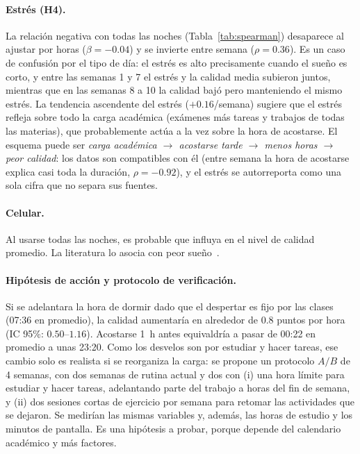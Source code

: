 \documentclass[conference]{IEEEtran}
\begin{document}
\paragraph{Estrés (H4).} La relación negativa con todas las noches (Tabla~\ref{tab:spearman}) desaparece al ajustar por horas ($\beta=-0.04$) y se invierte entre semana ($\rho=0.36$). Es un caso de confusión por el tipo de día: el estrés es alto precisamente cuando el sueño es corto, y entre las semanas 1 y 7 el estrés y la calidad media subieron juntos, mientras que en las semanas 8 a 10 la calidad bajó pero manteniendo el mismo estrés. La tendencia ascendente del estrés ($+0.16$/semana) sugiere que el estrés refleja sobre todo la carga académica (exámenes más tareas y trabajos de todas las materias), que probablemente actúa a la vez sobre la hora de acostarse. El esquema puede ser \textit{carga académica $\rightarrow$ acostarse tarde $\rightarrow$ menos horas $\rightarrow$ peor calidad}: los datos son compatibles con él (entre semana la hora de acostarse explica casi toda la duración, $\rho=-0.92$), y el estrés se autorreporta como una sola cifra que no separa sus fuentes.

\paragraph{Celular.} Al usarse todas las noches, es probable que influya en el nivel de calidad promedio. La literatura lo asocia con peor sueño~\cite{ref10,ref11,ref12}.

\paragraph{Hipótesis de acción y protocolo de verificación.} Si se adelantara la hora de dormir dado que el despertar es fijo por las clases (07:36 en promedio), la calidad aumentaría en alrededor de $0.8$ puntos por hora (IC 95\%: $0.50$--$1.16$). Acostarse 1~h antes equivaldría a pasar de 00:22 en promedio a unas 23:20. Como los desvelos son por estudiar y hacer tareas, ese cambio solo es realista si se reorganiza la carga: se propone un protocolo $A/B$ de 4 semanas, con dos semanas de rutina actual y dos con (i) una hora límite para estudiar y hacer tareas, adelantando parte del trabajo a horas del fin de semana, y (ii) dos sesiones cortas de ejercicio por semana para retomar las actividades que se dejaron. Se medirían las mismas variables y, además, las horas de estudio y los minutos de pantalla. Es una hipótesis a probar, porque depende del calendario académico y más factores.
\end{document}
